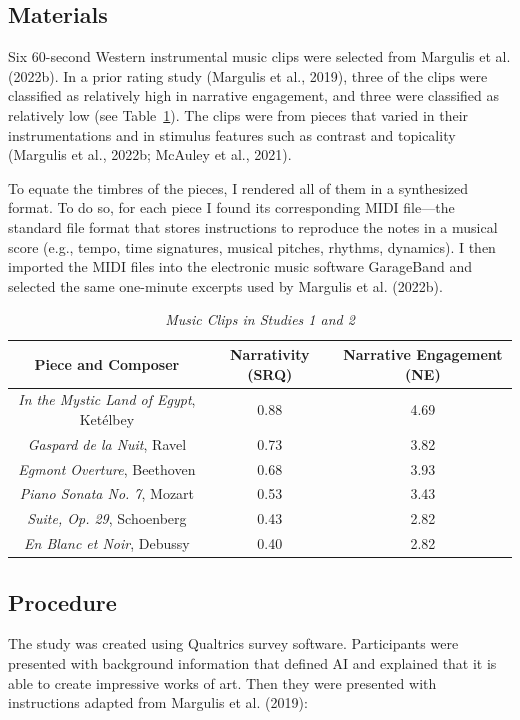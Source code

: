 \documentclass[12pt,twoside]{reedthesis}
\begin{document}
\subsection{Materials}
Six 60-second Western instrumental music clips were selected from Margulis et al. (2022b). In a prior rating study (Margulis et al., 2019), three of the clips were classified as relatively high in narrative engagement, and three were classified as relatively low (see Table~\ref*{table-stimuli}). The clips were from pieces that varied in their instrumentations and in stimulus features such as contrast and topicality (Margulis et al., 2022b; McAuley et al., 2021).

To equate the timbres of the pieces, I rendered all of them in a synthesized format. To do so, for each piece I found its corresponding MIDI file—the standard file format that stores instructions to reproduce the notes in a musical score (e.g., tempo, time signatures, musical pitches, rhythms, dynamics). I then imported the MIDI files into the electronic music software GarageBand and selected the same one-minute excerpts used by Margulis et al. (2022b).


\begin{table}[h]
	\caption {\emph{Music Clips in Studies 1 and 2}} \label{table-stimuli}
	\bigskip
	\begin{tabular}{c c c}
	\toprule
	Piece and Composer & Narrativity (SRQ) & Narrative Engagement (NE) \\
	\hline
	\emph{In the Mystic Land of Egypt}, Ketélbey & 0.88 & 4.69 \\
	\hline
	\emph{Gaspard de la Nuit}, Ravel & 0.73 & 3.82 \\
	\hline
	\emph{Egmont Overture}, Beethoven & 0.68 & 3.93 \\ 
	\hline
	\emph{Piano Sonata No. 7}, Mozart & 0.53 & 3.43 \\
	\hline
	\emph{Suite, Op. 29}, Schoenberg & 0.43 & 2.82 \\
	\hline
	\emph{En Blanc et Noir}, Debussy & 0.40 & 2.82 \\
	\bottomrule
	\end{tabular}\par
	\end{table}
	

\subsection{Procedure}

The study was created using Qualtrics survey software. Participants were presented with background information that defined AI and explained that it is able to create impressive works of art. Then they were presented with instructions adapted from Margulis et al. (2019):
\\ 
\end{document}

